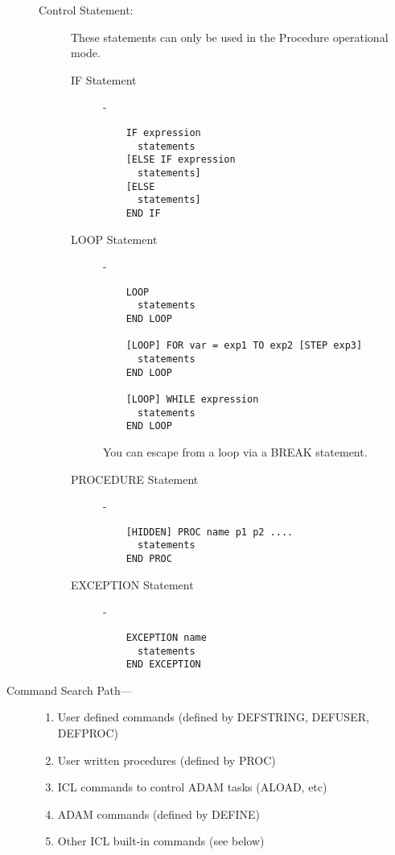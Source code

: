 \begin{description}
\begin{description}
\item [Control Statement:] \mbox{}

These statements can only be used in the Procedure operational mode.
\begin{description}

\item [IF Statement] -

\begin{verbatim}
    IF expression
      statements
    [ELSE IF expression
      statements]
    [ELSE
      statements]
    END IF
\end{verbatim}

\item [LOOP Statement] -

\begin{verbatim}
    LOOP
      statements
    END LOOP

    [LOOP] FOR var = exp1 TO exp2 [STEP exp3]
      statements
    END LOOP

    [LOOP] WHILE expression
      statements
    END LOOP
\end{verbatim}
You can escape from a loop via a BREAK statement.

\newpage

\item [PROCEDURE Statement] -

\begin{verbatim}
    [HIDDEN] PROC name p1 p2 ....
      statements
    END PROC
\end{verbatim}

\item [EXCEPTION Statement] -

\begin{verbatim}
    EXCEPTION name
      statements
    END EXCEPTION
\end{verbatim}

\end{description}
\end{description}

\item [Command Search Path--- ]

\begin{enumerate}
\item User defined commands (defined by DEFSTRING, DEFUSER, DEFPROC)
\item User written procedures (defined by PROC)
\item ICL commands to control ADAM tasks (ALOAD, etc)
\item ADAM commands (defined by DEFINE)
\item Other ICL built-in commands (see below)
\end{enumerate}
\end{description}

